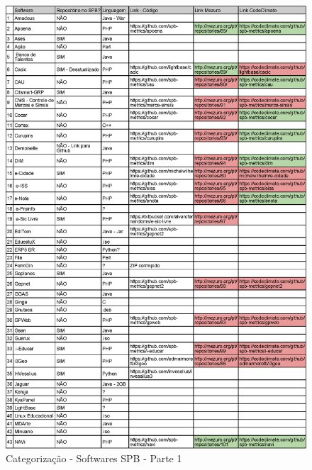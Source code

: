 \begin{anexosenv}
\begin{figure}[!htb]
	\centering
    \includegraphics[keepaspectratio=true,scale=0.85]
    {tabelas/spb_1.eps}
  \caption{Categorização - Softwares SPB - Parte 1}
  \label{fig:softwares_spb_1}
\end{figure}


\end{anexosenv}

